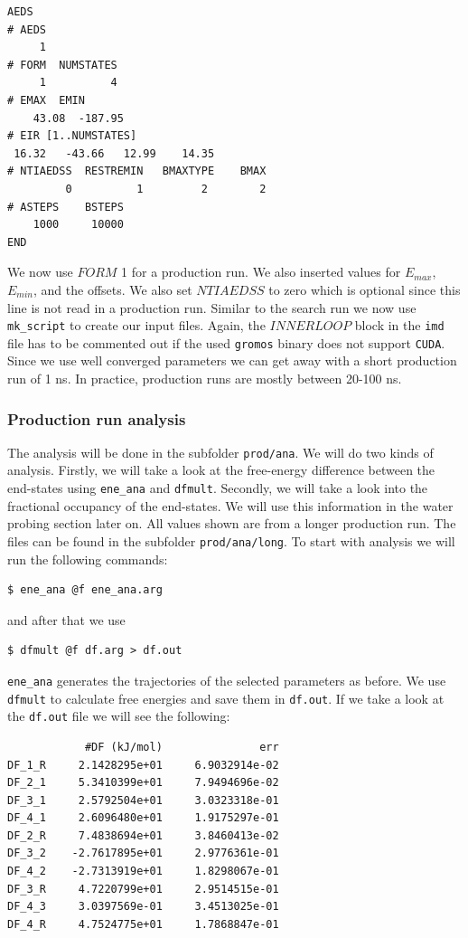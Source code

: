 \begin{lstlisting}
AEDS
# AEDS
     1
# FORM  NUMSTATES
     1          4
# EMAX  EMIN
    43.08  -187.95
# EIR [1..NUMSTATES]
 16.32   -43.66   12.99    14.35 
# NTIAEDSS  RESTREMIN   BMAXTYPE    BMAX   
         0          1         2        2      
# ASTEPS    BSTEPS
    1000     10000 
END
\end{lstlisting}

We now use $FORM$ 1 for a production run. We also inserted values for $E_{max}$, $E_{min}$, and the offsets. We also set $NTIAEDSS$ to zero which is optional since this line is not read in a production run. Similar to the search run we now use \texttt{mk\_script} to create our input files. Again, the $INNERLOOP$ block in the \texttt{imd} file has to be commented out if the used \texttt{gromos} binary does not support \texttt{CUDA}.
Since we use well converged parameters we can get away with a short production run of 1 ns. In practice, production runs are mostly between 20-100 ns.

\subsubsection{Production run analysis}
The analysis will be done in the subfolder \texttt{prod/ana}. We will do two kinds of analysis. Firstly, we will take a look at the free-energy difference between the end-states using \texttt{ene\_ana} and \texttt{dfmult}. Secondly, we will take a look into the fractional occupancy of the end-states. We will use this information in the water probing section later on. All values shown are from a longer production run. The files can be found in the subfolder \texttt{prod/ana/long}. To start with analysis we will run the following commands:

\begin{lstlisting}
$ ene_ana @f ene_ana.arg
\end{lstlisting}

and after that we use

\begin{lstlisting}
$ dfmult @f df.arg > df.out
\end{lstlisting}

\texttt{ene\_ana} generates the trajectories of the selected parameters as before. We use \texttt{dfmult} to calculate free energies and save them in \texttt{df.out}. If we take a look at the \texttt{df.out} file we will see the following:

\begin{lstlisting}
            #DF (kJ/mol)               err
DF_1_R     2.1428295e+01     6.9032914e-02
DF_2_1     5.3410399e+01     7.9494696e-02
DF_3_1     2.5792504e+01     3.0323318e-01
DF_4_1     2.6096480e+01     1.9175297e-01
DF_2_R     7.4838694e+01     3.8460413e-02
DF_3_2    -2.7617895e+01     2.9776361e-01
DF_4_2    -2.7313919e+01     1.8298067e-01
DF_3_R     4.7220799e+01     2.9514515e-01
DF_4_3     3.0397569e-01     3.4513025e-01
DF_4_R     4.7524775e+01     1.7868847e-01
\end{lstlisting}

